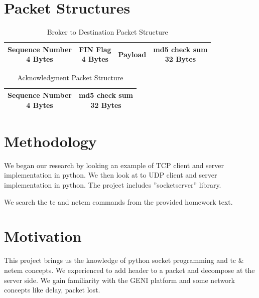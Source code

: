 \documentclass[conference]{IEEEtran}
\begin{document}
\section{Packet Structures}



\begin{table}[h]
\renewcommand{\arraystretch}{2}
\caption{Broker to Destination Packet Structure}
\label{tab:example}
\centering
\begin{tabular}{|c|c|c|c|}
    \hline
     \makecell{ Sequence Number \\ 4 Bytes} & \makecell{ FIN Flag \\ 4 Bytes} & Payload & \makecell{ md5 check sum \\ 32 Bytes} \\
    \hline
    
     
\end{tabular}
\end{table}

\begin{table}[h]
\renewcommand{\arraystretch}{1.3}
\caption{Acknowledgment Packet Structure}
\label{tab:example}
\centering
\begin{tabular}{|c|c|}
    \hline
     \makecell{ Sequence Number \\ 4 Bytes} & \makecell{ md5 check sum \\ 32 Bytes}  \\
    \hline
    
     
\end{tabular}
\end{table}



\section{Methodology}


We began our research by looking an example of TCP client and server implementation in python. We then look at to UDP client and server implementation in python. The project includes ''socketserver'' library.

We search the tc and netem commands from the provided homework text.

\section{Motivation}

This project brings us the knowledge of python socket programming and tc \& netem concepts. We experienced to add header to a packet and decompose at the server side. We gain familiarity with the GENI platform and some network concepts like delay, packet lost.
\end{document}
